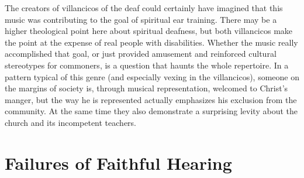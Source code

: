 The creators of villancicos of the deaf could certainly have imagined that this 
music was contributing to the goal of spiritual ear training.
There may be a higher theological point here about spiritual deafness, but both 
 villancicos make the point at the expense of real people with 
disabilities.
Whether the music really accomplished that goal, or just provided amusement and 
reinforced cultural stereotypes for commoners, is a question that haunts the 
whole repertoire.
In a pattern typical of this genre (and especially vexing in the 
 villancicos), someone on the margins of society is, through 
musical representation, welcomed to Christ's manger, but the way he is 
represented actually emphasizes his exclusion from the community.%
    \Autocites{Baker:EthnicVC}{Baker:PerformancePostColonial}
At the same time they also demonstrate a surprising levity about the church and 
its incompetent teachers.


\section{Failures of Faithful Hearing}

